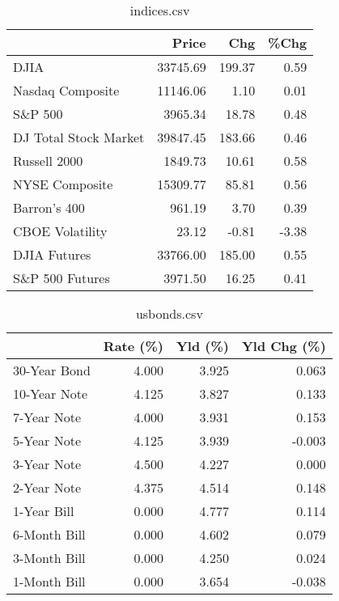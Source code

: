 \documentclass{article}%
\begin{document}
%


\begin{table}[htbp]%
\caption{indices.csv}%
\centering%
\begin{adjustbox}{width=1\textwidth}%
\begin{tabular}{lrrr}
\toprule
                      &    Price &    Chg &  \%Chg \\
\midrule
                 DJIA & 33745.69 & 199.37 &  0.59 \\
     Nasdaq Composite & 11146.06 &   1.10 &  0.01 \\
              S\&P 500 &  3965.34 &  18.78 &  0.48 \\
DJ Total Stock Market & 39847.45 & 183.66 &  0.46 \\
         Russell 2000 &  1849.73 &  10.61 &  0.58 \\
       NYSE Composite & 15309.77 &  85.81 &  0.56 \\
         Barron's 400 &   961.19 &   3.70 &  0.39 \\
      CBOE Volatility &    23.12 &  -0.81 & -3.38 \\
         DJIA Futures & 33766.00 & 185.00 &  0.55 \\
      S\&P 500 Futures &  3971.50 &  16.25 &  0.41 \\
\bottomrule
\end{tabular}
%
\end{adjustbox}%
\end{table}

%


\begin{table}[htbp]%
\caption{usbonds.csv}%
\centering%
\begin{adjustbox}{width=1\textwidth}%
\begin{tabular}{lrrr}
\toprule
             &  Rate (\%) &  Yld (\%) &  Yld Chg (\%) \\
\midrule
30-Year Bond &     4.000 &    3.925 &        0.063 \\
10-Year Note &     4.125 &    3.827 &        0.133 \\
 7-Year Note &     4.000 &    3.931 &        0.153 \\
 5-Year Note &     4.125 &    3.939 &       -0.003 \\
 3-Year Note &     4.500 &    4.227 &        0.000 \\
 2-Year Note &     4.375 &    4.514 &        0.148 \\
 1-Year Bill &     0.000 &    4.777 &        0.114 \\
6-Month Bill &     0.000 &    4.602 &        0.079 \\
3-Month Bill &     0.000 &    4.250 &        0.024 \\
1-Month Bill &     0.000 &    3.654 &       -0.038 \\
\bottomrule
\end{tabular}
%
\end{adjustbox}%
\end{table}
\end{document}
